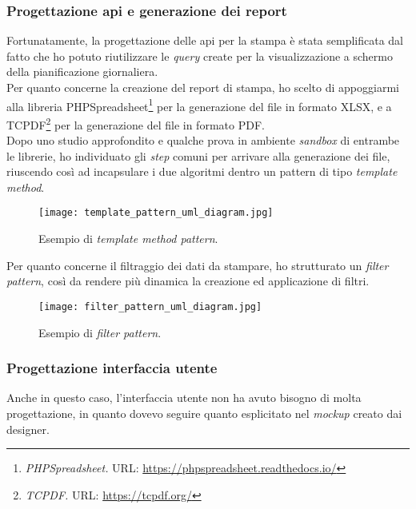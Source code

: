 \subsubsection{Progettazione \acrshort{api} e generazione dei report}
Fortunatamente, la progettazione delle \acrshort{api} per la stampa è stata semplificata dal fatto che ho potuto riutilizzare le \textit{query} create per la visualizzazione a schermo della pianificazione giornaliera. \\
Per quanto concerne la creazione del report di stampa, ho scelto di appoggiarmi alla libreria PHPSpreadsheet\footnote{\textit{PHPSpreadsheet.} URL: \href{https://phpspreadsheet.readthedocs.io/en/latest/}{https://phpspreadsheet.readthedocs.io/}} per la generazione del file in formato XLSX, e a TCPDF\footnote{\textit{TCPDF.} URL: \href{https://tcpdf.org/}{https://tcpdf.org/}} per la generazione del file in formato PDF.\\
Dopo uno studio approfondito e qualche prova in ambiente \textit{sandbox} di entrambe le librerie, ho individuato gli \textit{step} comuni per arrivare alla generazione dei file, riuscendo così ad incapsulare i due algoritmi dentro un pattern di tipo \textit{template method}.\\
\begin{figure}[h]
\texttt{[image: template\_pattern\_uml\_diagram.jpg]}
\centering
\caption{Esempio di \textit{template method pattern}.}
\label{fig:template-pattern}
\end{figure}

Per quanto concerne il filtraggio dei dati da stampare, ho strutturato un \textit{filter pattern}, così da rendere più dinamica la creazione ed applicazione di filtri. \\
\begin{figure}[h]
\texttt{[image: filter\_pattern\_uml\_diagram.jpg]}
\centering
\caption{Esempio di \textit{filter pattern}.}
\label{fig:filter-pattern}
\end{figure}

\subsubsection{Progettazione interfaccia utente}
Anche in questo caso, l'interfaccia utente non ha avuto bisogno di molta progettazione, in quanto dovevo seguire quanto esplicitato nel \textit{\gls{mockup}} creato dai designer.

